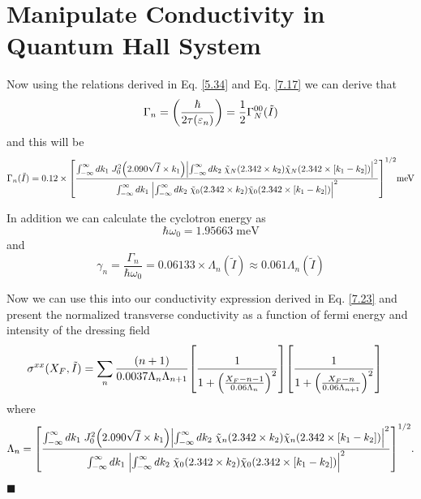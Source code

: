 \section{Manipulate Conductivity in Quantum Hall System}

Now using the relations derived in Eq. \eqref{5.34} and Eq. \eqref{7.17} we can derive that
\begin{equation} \label{8.1}
  \Gamma_n = \qty(\frac{\hbar }{2\tau(\varepsilon_n)}) =
  \frac{1}{2}\Gamma^{00}_{N}(\tilde{I})
\end{equation}
and this will be
\begin{equation} \label{8.2}
  \Gamma_n(\tilde{I}) = 0.12\times
  \qty[
  \frac
  {\int_{-\infty}^{\infty} d {k}_1 \;
  J_0^2\qty(2.090\sqrt{\tilde{I}}\times{k}_1)
  \qty|
  \int_{-\infty}^{\infty} d{k}_2 \;
  \tilde{\chi}_{N}\qty(2.342 \times k_2)
  \tilde{\chi}_{N}\qty(2.342 \times \qty[{k}_1 - {k}_2])|^2}
  {\int_{-\infty}^{\infty} d {k}_1 \;
  \qty|
  \int_{-\infty}^{\infty} d{k}_2 \;
  \tilde{\chi}_{0}\qty(2.342 \times k_2)
  \tilde{\chi}_{0}\qty(2.342 \times \qty[{k}_1 - {k}_2])|^2}
  ]^{1/2} \text{meV}
\end{equation}

\noindent
In addition we can calculate the cyclotron energy as
\begin{equation} \label{8.3}
  \hbar\omega_0 = 1.95663 \;\text{meV}
\end{equation}
and
\begin{equation} \label{8.4}
  \gamma_n = \frac{\Gamma_n}{\hbar \omega_0} = 0.06133 \times \Lambda_n(\tilde{I}) \approx 0.061 \Lambda_n(\tilde{I})
\end{equation}

\noindent
Now we can use this into our conductivity expression derived in Eq. \eqref{7.23} and present the normalized transverse conductivity as a function of fermi energy and intensity of the dressing field
\begin{equation} \label{8.5}
  \begin{aligned}
    \sigma^{xx}(X_F,\tilde{I}) & =
    \sum_{n}
    \frac{\qty(n+1)}{0.0037\Lambda_n \Lambda_{n+1}}
    \qty[
      \frac{1}
      {
        1 + \qty(\frac{X_F - n -1}{0.06\Lambda_n})^2
      }
    ]
    \qty[
      \frac{1}
      {
        1 + \qty(\frac{X_F - n}{0.06\Lambda_{n+1}})^2
      }
    ]
  \end{aligned}
\end{equation}
where
\begin{equation} \label{8.6}
    \Lambda_n  =
    \qty[
    \frac
    {\int_{-\infty}^{\infty} d {k}_1 \;
    J_0^2\qty(2.090\sqrt{\tilde{I}}\times{k}_1)
    \qty|
    \int_{-\infty}^{\infty} d{k}_2 \;
    \tilde{\chi}_{n}\qty(2.342 \times k_2)
    \tilde{\chi}_{n}\qty(2.342 \times \qty[{k}_1 - {k}_2])|^2}
    {\int_{-\infty}^{\infty} d {k}_1 \;
    \qty|
    \int_{-\infty}^{\infty} d{k}_2 \;
    \tilde{\chi}_{0}\qty(2.342 \times k_2)
    \tilde{\chi}_{0}\qty(2.342 \times \qty[{k}_1 - {k}_2])|^2}
    ]^{1/2}.
\end{equation}
\hfill$\blacksquare$


